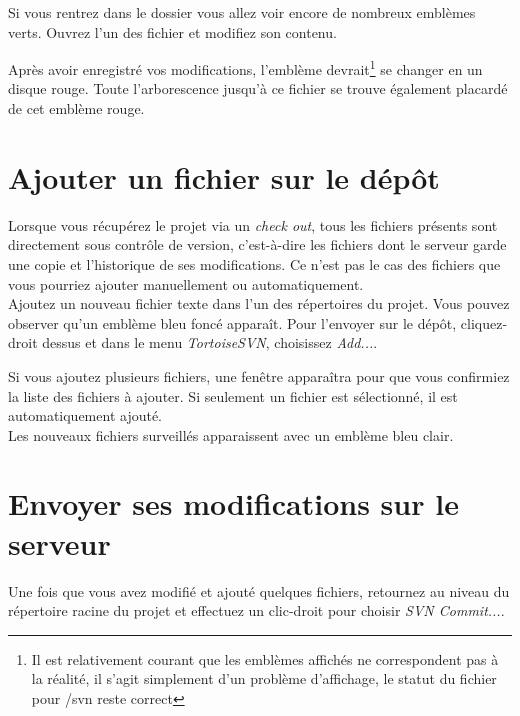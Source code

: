 Si vous rentrez dans le dossier vous allez voir encore de nombreux emblèmes verts. Ouvrez l'un des fichier et modifiez son contenu.

Après avoir enregistré vos modifications, l'emblème devrait\footnote{Il est relativement courant que les emblèmes affichés ne correspondent pas à la réalité, il s'agit simplement d'un problème d'affichage, le statut du fichier pour /svn reste correct} se changer en un disque rouge. Toute l'arborescence jusqu'à ce fichier se trouve également placardé de cet emblème rouge.


\section{Ajouter un fichier sur le dépôt}


Lorsque vous récupérez le projet via un \emph{check out}, tous les fichiers présents sont directement sous contrôle de version, c'est-à-dire les fichiers dont le serveur garde une copie et l'historique de ses modifications. Ce n'est pas le cas des fichiers que vous pourriez ajouter manuellement ou automatiquement.\\

Ajoutez un nouveau fichier texte dans l'un des répertoires du projet. Vous pouvez observer qu'un emblème bleu foncé apparaît. Pour l'envoyer sur le dépôt, cliquez-droit dessus et dans le menu \emph{TortoiseSVN}, choisissez \emph{Add...}.

Si vous ajoutez plusieurs fichiers, une fenêtre apparaîtra pour que vous confirmiez la liste des fichiers à ajouter. Si seulement un fichier est sélectionné, il est automatiquement ajouté.\\

Les nouveaux fichiers surveillés apparaissent avec un emblème bleu clair.


\section{Envoyer ses modifications sur le serveur}

Une fois que vous avez modifié et ajouté quelques fichiers, retournez au niveau du répertoire racine du projet et effectuez un clic-droit pour choisir \emph{SVN Commit...}.

